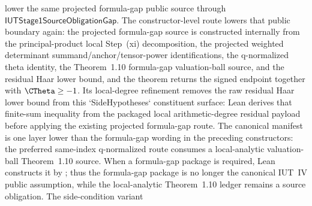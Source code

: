 \begin{proposition}
  lower the same projected formula-gap public source through
  \(\mathsf{IUTStage1SourceObligationGap}\).
  The constructor-level route
  lowers that public boundary again: the projected formula-gap source is
  constructed internally from the principal-product local Step~(xi)
  decomposition, the projected weighted determinant summand/anchor/tensor-power
  identifications, the q-normalized theta identity, the Theorem~1.10
  formula-gap valuation-ball source, and the residual Haar lower bound, and the
  theorem returns the signed endpoint together with \(\CTheta\geq -1\).
  Its local-degree refinement
  removes the raw residual Haar lower bound from this `SideHypotheses`
  constituent surface: Lean derives that finite-sum inequality from the
  packaged local arithmetic-degree residual payload before applying the
  existing projected formula-gap route.
  The canonical manifest is one layer lower than the formula-gap wording in the
  preceding constructors: the preferred same-index q-normalized route consumes
  a local-analytic valuation-ball Theorem~1.10 source.  When a formula-gap
  package is required, Lean constructs it by
  ;
  thus the formula-gap package is no longer the canonical IUT~IV public
  assumption, while the local-analytic Theorem~1.10 ledger remains a source
  obligation.
  The side-condition variant

\end{proposition}
